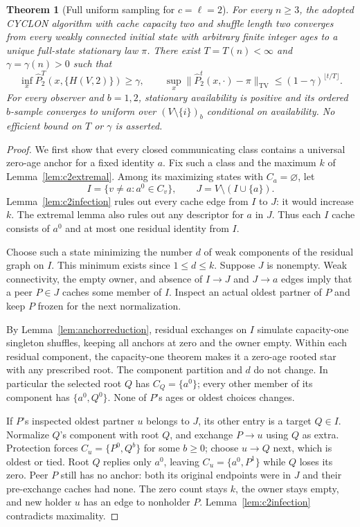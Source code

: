 \documentclass[11pt]{article}
\newtheorem{theorem}{Theorem}
\newcommand{\TV}{\mathrm{TV}}
\begin{document}
\begin{theorem}[Full uniform sampling for $c=\ell=2$]
\label{thm:thesisc2}
For every $n\ge3$, the adopted CYCLON algorithm with
cache capacity two and shuffle length two converges from
every weakly connected initial state with arbitrary finite
integer ages to a unique full-state stationary law $\pi$.
There exist $T=T(n)<\infty$ and $\gamma=\gamma(n)>0$ such that
\[
 \inf_x\widehat P_2^T(x,\{H(V,2)\})\ge\gamma,
 \qquad
 \sup_x\|\widehat P_2^t(x,\cdot)-\pi\|_{\TV}
 \le(1-\gamma)^{\lfloor t/T\rfloor}.
\]
For every observer and $b=1,2$, stationary availability
is positive and its ordered $b$-sample converges to uniform
over $(V\setminus\{i\})_b$ conditional on availability.
No efficient bound on $T$ or $\gamma$ is asserted.
\end{theorem}
\begin{proof}
We first show that every closed communicating class
contains a universal zero-age anchor for a fixed identity
$a$. Fix such a class and the maximum $k$ of
Lemma~\ref{lem:c2extremal}. Among its maximizing states
with $C_a=\varnothing$, let
\[
 I=\{v\ne a:a^0\in C_v\},\qquad
 J=V\setminus(I\cup\{a\}).
\]
Lemma~\ref{lem:c2infection} rules out every cache edge
from $I$ to $J$: it would increase $k$. The extremal
lemma also rules out any descriptor for $a$ in $J$.
Thus each $I$ cache consists of $a^0$ and at most one
residual identity from $I$.

Choose such a state minimizing the number $d$ of weak
components of the residual graph on $I$. This minimum
exists since $1\le d\le k$. Suppose $J$ is nonempty.
Weak connectivity, the empty owner, and absence of
$I\to J$ and $J\to a$ edges imply that a peer
$P\in J$ caches some member of $I$. Inspect an actual
oldest partner of $P$ and keep $P$ frozen for the next
normalization.

By Lemma~\ref{lem:anchorreduction}, residual exchanges
on $I$ simulate capacity-one singleton shuffles, keeping
all anchors at zero and the owner empty. Within each
residual component, the capacity-one theorem makes it
a zero-age rooted star with any prescribed root.
The component partition and $d$ do not change.
In particular the selected root $Q$ has $C_Q=\{a^0\}$;
every other member of its component has
$\{a^0,Q^0\}$. None of $P$'s ages or oldest choices changes.

If $P$'s inspected oldest partner $u$ belongs to $J$,
its other entry is a target $Q\in I$. Normalize $Q$'s
component with root $Q$, and exchange $P\to u$ using
$Q$ as extra. Protection forces
$C_u=\{P^0,Q^b\}$ for some $b\ge0$; choose $u\to Q$
next, which is oldest or tied. Root $Q$ replies only
$a^0$, leaving $C_u=\{a^0,P^1\}$ while $Q$ loses its
zero. Peer $P$ still has no anchor: both its original
endpoints were in $J$ and their pre-exchange caches had
none. The zero count stays $k$, the owner stays empty,
and new holder $u$ has an edge to nonholder $P$.
Lemma~\ref{lem:c2infection} contradicts maximality.


\end{proof}
\end{document}
